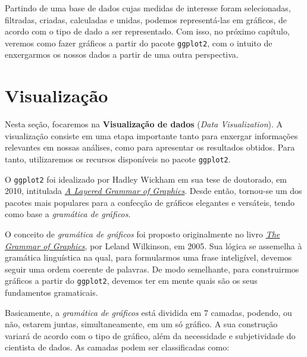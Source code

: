 \documentclass[
  brazilian,
]{book}
\begin{document}
Partindo de uma base de dados cujas medidas de interesse foram selecionadas, filtradas, criadas, calculadas e unidas, podemos representá-las em gráficos, de acordo com o tipo de dado a ser representado. Com isso, no próximo capítulo, veremos como fazer gráficos a partir do pacote \texttt{ggplot2}, com o intuito de enxergarmos os nossos dados a partir de uma outra perspectiva.

\hypertarget{graf}{%
\chapter{Visualização}\label{graf}}

Nesta seção, focaremos na \textbf{Visualização de dados} (\emph{Data Visualization}). A visualização consiste em uma etapa importante tanto para enxergar informações relevantes em nossas análises, como para apresentar os resultados obtidos. Para tanto, utilizaremos os recursos disponíveis no pacote \texttt{ggplot2}.

O \texttt{ggplot2} foi idealizado por Hadley Wickham em sua tese de doutorado, em 2010, intitulada \href{http://vita.had.co.nz/papers/layered-grammar.pdf}{\emph{A Layered Grammar of Graphics}}. Desde então, tornou-se um dos pacotes mais populares para a confecção de gráficos elegantes e versáteis, tendo como base a \emph{gramática de gráficos}.

O conceito de \emph{gramática de gráficos} foi proposto originalmente no livro \href{https://www.springer.com/gp/book/9780387245447}{\emph{The Grammar of Graphics}}, por Leland Wilkinson, em 2005. Sua lógica se assemelha à gramática linguística na qual, para formularmos uma frase inteligível, devemos seguir uma ordem coerente de palavras. De modo semelhante, para construirmos gráficos a partir do \texttt{ggplot2}, devemos ter em mente quais são os seus fundamentos gramaticais.

Basicamente, a \emph{gramática de gráficos} está dividida em 7 camadas, podendo, ou não, estarem juntas, simultaneamente, em um só gráfico. A sua construção variará de acordo com o tipo de gráfico, além da necessidade e subjetividade do cientista de dados. As camadas podem ser classificadas como:
\end{document}
